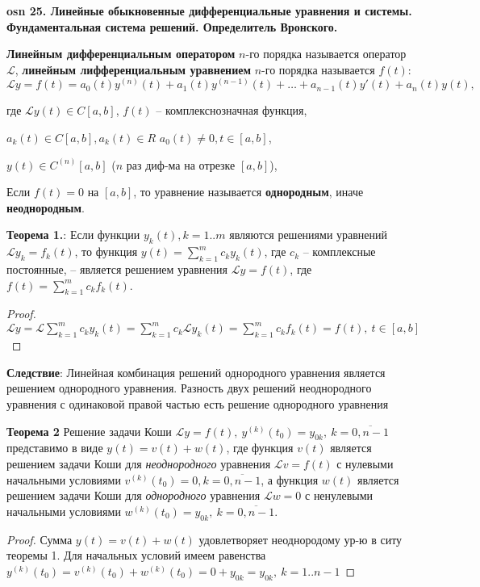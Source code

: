\setcounter{section}{15}
\setcounter{subsection}{25}
\setcounter{equation}{0}
\textbf{\LARGE osn 25. Линейные обыкновенные дифференциальные уравнения и системы. Фундаментальная система решений. Определитель Вронского.}

\textbf{Линейным дифференциальным оператором} $n$-го порядка называется оператор $\mathcal{L}$, \textbf{линейным лифференциальным уравнением}  $n$-го порядка называется $f(t)$:
$$\mathcal{L} y = f(t) = a_0(t)y^{(n)}(t) + a_1(t)y^{(n-1)}(t) +\dots + a_{n-1}(t)y'(t) + a_n(t)y(t),$$

где $\mathcal{L}y(t) \in C[a, b]$, $f(t)$ -- комплекснозначная функция, 

$a_k(t) \in C[a,b], a_k(t) \in R$ $a_0(t) \neq 0, t \in [a,b]$,

$y(t) \in C^{(n)}[a,b]$ ($n$ раз диф-ма на отрезке $[a,b]$), 


Если $f(t) = 0$ на $[a, b]$, то уравнение называется \textbf{однородным}, иначе \textbf{неоднородным}.

\textbf{Теорема 1.}:
Если функции $y_k(t), k=1..m$ являются решениями уравнений $\mathcal{L} y_k = f_k(t)$, то функция $y(t) = \sum_{k=1}^m c_k y_k(t)$, где $c_k$ -- комплексные постоянные, -- является решением уравнения  $\mathcal{L} y = f(t)$, где $f(t) =  \sum_{k=1}^m c_k f_k(t)$.

\begin{proof}
$\mathcal{L} y = \mathcal{L} \sum_{k=1}^m c_k y_k(t) = \sum_{k=1}^m c_k \mathcal{L} y_k(t) = \sum_{k=1}^m c_k f_k(t) = f(t), \ t \in [a,b]$
\end{proof}

\textbf{Следствие}: Линейная комбинация решений однородного уравнения является решением однородного уравнения. Разность двух решений неоднородного уравнения с одинаковой правой частью есть решение однородного уравнения

\textbf{Теорема 2} Решение задачи Коши $\mathcal{L}y = f(t),~y^{(k)}(t_0) = y_{0k},~k = \overline{0, n - 1}$ представимо в виде $y(t) = v(t) + w(t)$, где функция $v(t)$ является решением задачи Коши для \textit{неоднородного} уравнения $\mathcal{L}v = f(t)$ с нулевыми начальными условиями $v^{(k)}(t_0) = 0, k = \overline{0, n - 1}$, а функция $w(t)$ является решением задачи Коши для \textit{однородного} уравнения $\mathcal{L}w = 0$ с ненулевыми начальными условиями $w^{(k)}(t_0) = y_{0k},~k = \overline{0, n - 1}$.

\begin{proof}
Сумма $y(t) = v(t) + w(t)$ удовлетворяет неоднородому ур-ю в ситу теоремы 1. Для начальных условий имеем равенства $y^{(k)}(t_0) = v^{(k)}(t_0) + w^{(k)}(t_0) = 0 + y_{0k} = y_{0k}, \ k=1..n-1$
\end{proof}

